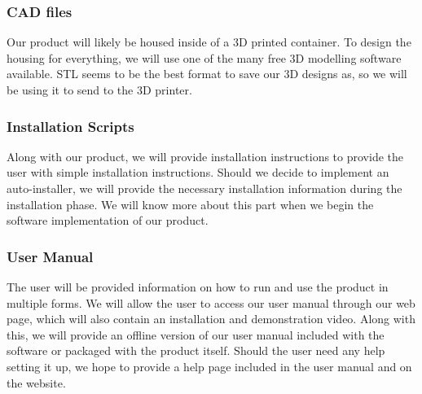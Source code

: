 \subsubsection{CAD files}
Our product will likely be housed inside of a 3D printed container. To design the housing for everything, we will use one of the many free 3D modelling software available. STL seems to be the best format to save our 3D designs as, so we will be using it to send to the 3D printer.

\subsubsection{Installation Scripts}
Along with our product, we will provide installation instructions to provide the user with simple installation instructions. Should we decide to implement an auto-installer, we will provide the necessary installation information during the installation phase. We will know more about this part when we begin the software implementation of our product.

\subsubsection{User Manual}
The user will be provided information on how to run and use the product in multiple forms. We will allow the user to access our user manual through our web page, which will also contain an installation and demonstration video. 
Along with this, we will provide an offline version of our user manual included with the software or packaged with the product itself. Should the user need any help setting it up, we hope to provide a help page included in the user manual and on the website.